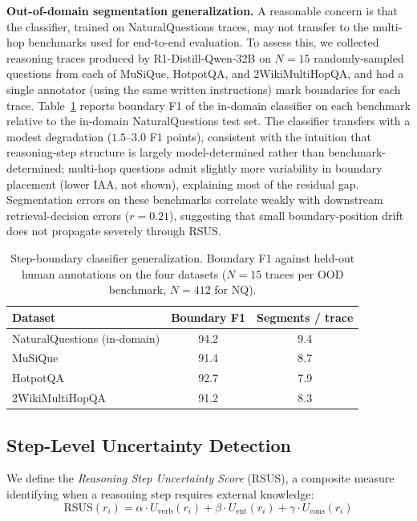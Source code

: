 \documentclass[sigconf,natbib=true]{acmart}
\begin{document}
\textbf{Out-of-domain segmentation generalization.}
A reasonable concern is that the classifier, trained on NaturalQuestions traces, may not transfer to the multi-hop benchmarks used for end-to-end evaluation. To assess this, we collected reasoning traces produced by R1-Distill-Qwen-32B on $N=15$ randomly-sampled questions from each of MuSiQue, HotpotQA, and 2WikiMultiHopQA, and had a single annotator (using the same written instructions) mark boundaries for each trace. Table~\ref{tab:seg_ood} reports boundary F1 of the in-domain classifier on each benchmark relative to the in-domain NaturalQuestions test set. The classifier transfers with a modest degradation ($1.5$--$3.0$ F1 points), consistent with the intuition that reasoning-step structure is largely model-determined rather than benchmark-determined; multi-hop questions admit slightly more variability in boundary placement (lower IAA, not shown), explaining most of the residual gap. Segmentation errors on these benchmarks correlate weakly with downstream retrieval-decision errors ($r=0.21$), suggesting that small boundary-position drift does not propagate severely through RSUS.

\begin{table}[h]
\small
\centering
\caption{Step-boundary classifier generalization. Boundary F1 against held-out human annotations on the four datasets ($N=15$ traces per OOD benchmark, $N=412$ for NQ).}
\label{tab:seg_ood}
\begin{tabular}{@{}lcc@{}}
\toprule
\textbf{Dataset} & \textbf{Boundary F1} & \textbf{Segments / trace} \\
\midrule
NaturalQuestions (in-domain) & 94.2 & 9.4 \\
MuSiQue                      & 91.4 & 8.7 \\
HotpotQA                     & 92.7 & 7.9 \\
2WikiMultiHopQA              & 91.2 & 8.3 \\
\bottomrule
\end{tabular}
\end{table}
\subsection{Step-Level Uncertainty Detection}
We define the \emph{Reasoning Step Uncertainty Score} (RSUS), a composite measure identifying when a reasoning step requires external knowledge:
\begin{equation}
\text{RSUS}(r_i) = \alpha \cdot U_{\text{verb}}(r_i) + \beta \cdot U_{\text{ent}}(r_i) + \gamma \cdot U_{\text{cons}}(r_i)
\label{eq:rsus}
\end{equation}
\end{document}
